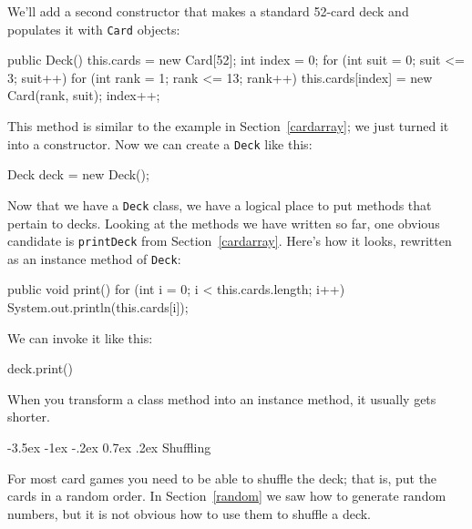 \documentclass[12pt]{book}
\makeatletter
\theoremstyle{exercise}
\newcommand{\java}[1]{\verb"#1"}
\renewcommand{\section}{\@startsection{section}{1}{\z@}%
    {-3.5ex \@plus -1ex \@minus -.2ex}%
    {0.7ex \@plus.2ex}%
    {\normalfont\Large\bfseries}}
\newcommand{\java}[1]{\lstinline{#1}} %
\makeatother
\begin{document}
We'll add a second constructor that makes a standard 52-card deck and populates it with \java{Card} objects:

\begin{code}
    public Deck() {
        this.cards = new Card[52];
        int index = 0;
        for (int suit = 0; suit <= 3; suit++) {
            for (int rank = 1; rank <= 13; rank++) {
                this.cards[index] = new Card(rank, suit);
                index++;
            }
        }
    }
\end{code}


This method is similar to the example in Section~\ref{cardarray}; we just turned it into a constructor.
Now we can create a \java{Deck} like this:

\begin{code}
    Deck deck = new Deck();
\end{code}


Now that we have a \java{Deck} class, we have a logical place to put methods that pertain to decks.
Looking at the methods we have written so far, one obvious candidate is \java{printDeck} from Section~\ref{cardarray}.
Here's how it looks, rewritten as an instance method of \java{Deck}:

\begin{code}
    public void print() {
        for (int i = 0; i < this.cards.length; i++) {
            System.out.println(this.cards[i]);
        }
    }
\end{code}

We can invoke it like this:

\begin{code}
    deck.print()
\end{code}

When you transform a class method into an instance method, it usually gets shorter.


\section{Shuffling}
\label{shuffle}


For most card games you need to be able to shuffle the deck; that is, put the cards in a random order.
In Section~\ref{random} we saw how to generate random numbers, but it is not obvious how to use them to shuffle a deck.
\end{document}
